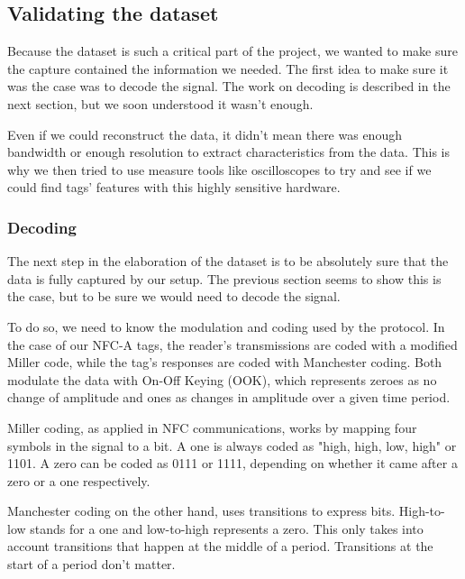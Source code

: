 \subsection{Validating the dataset} \label{validation}

Because the dataset is such a critical part of the project, we wanted to make sure the capture contained the information we needed. The first idea to make sure it was the case was to decode the signal. The work on decoding is described in the next section, but we soon understood it wasn't enough.

Even if we could reconstruct the data, it didn't mean there was enough bandwidth or enough resolution to extract characteristics from the data. This is why we then tried to use measure tools like oscilloscopes to try and see if we could find tags' features with this highly sensitive hardware.

\subsubsection{Decoding}

The next step in the elaboration of the dataset is to be absolutely sure that the data is fully captured by our setup. The previous section seems to show this is the case, but to be sure we would need to decode the signal.

To do so, we need to know the modulation and coding used by the protocol. In the case of our NFC-A tags, the reader's transmissions are coded with a modified Miller code, while the tag's responses are coded with Manchester coding. Both modulate the data with On-Off Keying (OOK), which represents zeroes as no change of amplitude and ones as changes in amplitude over a given time period. \cite{wiki_off_2020}

Miller coding, as applied in NFC communications, works by mapping four symbols in the signal to a bit. A one is always coded as "high, high, low, high" or 1101. A zero can be coded as 0111 or 1111, depending on whether it came after a zero or a one respectively. \cite{phy_nfc_coding}

Manchester coding on the other hand, uses transitions to express bits. High-to-low stands for a one and low-to-high represents a zero. This only takes into account transitions that happen at the middle of a period. Transitions at the start of a period don't matter. \cite{phy_nfc_coding, wiki_manchester_2019}

